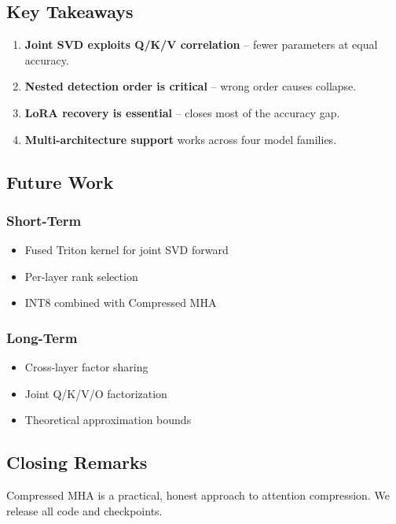 \subsection{Key Takeaways}

\begin{enumerate}
\item \textbf{Joint SVD exploits Q/K/V correlation} -- fewer parameters at equal
  accuracy.
\item \textbf{Nested detection order is critical} -- wrong order causes collapse.
\item \textbf{LoRA recovery is essential} -- closes most of the accuracy gap.
\item \textbf{Multi-architecture support} works across four model families.

\end{enumerate}
\subsection{Future Work}

\subsubsection{Short-Term}
\begin{itemize}
\item Fused Triton kernel for joint SVD forward
\item Per-layer rank selection
\item INT8 combined with Compressed MHA

\end{itemize}
\subsubsection{Long-Term}
\begin{itemize}
\item Cross-layer factor sharing
\item Joint Q/K/V/O factorization
\item Theoretical approximation bounds

\end{itemize}
\subsection{Closing Remarks}

Compressed MHA is a practical, honest approach to attention compression. We 
release all code and checkpoints.

